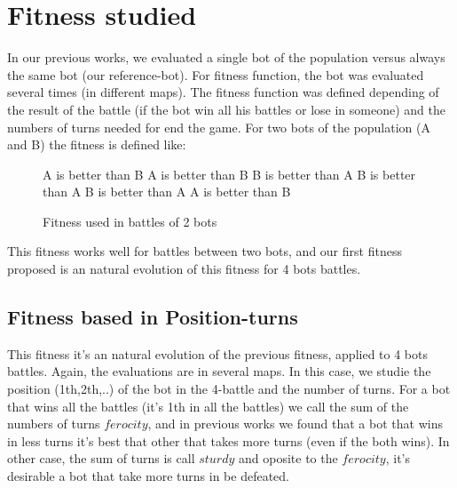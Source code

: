 \documentclass{llncs}
\begin{document}
\section{Fitness studied}
In our previous works, we evaluated a single bot of the population versus always the same bot (our reference-bot). For fitness function, the bot was evaluated several times (in different maps). The fitness function was defined depending of the result of the battle (if the bot win all his battles or lose in someone) and the numbers of turns needed for end the game. For two bots of the population (A and B) the fitness is defined like:

\begin{figure}
\begin{algorithmic}
    	\State A is better than B
    	\State A is better than B
    \Else
    	\State B is better than A
    \EndIf
\Else
    	\State B is better than A
    	\State B is better than A
    \Else
    	\State A is better than B
    \EndIf
\EndIf
\end{algorithmic}
\caption{Fitness used in battles of 2 bots}
\label{fig:fitness_clasico}
\end{figure}

This fitness works well for battles between two bots, and our first fitness proposed is an natural evolution of this fitness for 4 bots battles.


\subsection{Fitness based in Position-turns}

This fitness it's an natural evolution of the previous fitness, applied to 4 bots battles. Again, the evaluations are in several maps. In this case, we studie the position (1th,2th,..) of the bot in the 4-battle and the number of turns. For a bot that wins all the battles (it's 1th in all the battles) we call the sum of the numbers of turns {$ferocity$}, and in previous works we found that a bot that wins in less turns it's best that other that takes more turns (even if the both wins). In other case, the sum of turns is call {$sturdy$} and oposite to the {$ferocity$}, it's desirable a bot that take more turns in be defeated.
\end{document}
